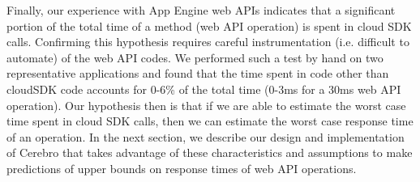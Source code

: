 Finally, our experience with App Engine web APIs indicates that a significant
portion of the total time of a method (web API operation) is spent in cloud SDK calls.
Confirming this hypothesis requires careful instrumentation (i.e. difficult
to automate) of the web API codes.  We performed such a test by hand on two 
representative applications and found that the time spent in code other than cloudSDK code
accounts for $0$-$6$\% of the total time (0-3ms for a 30ms web API operation).
Our hypothesis then is that if we are able to estimate the worst case time spent 
in cloud SDK calls, then we can estimate the worst case response time of an operation.
In the next section, we describe our design and implementation of Cerebro
that takes advantage of these characteristics and assumptions to make
predictions of upper bounds on response times of web API operations.
